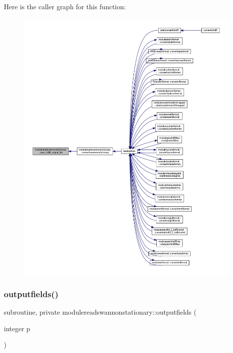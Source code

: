 Here is the caller graph for this function\+:\nopagebreak
\begin{figure}[H]
\begin{center}
\leavevmode
\includegraphics[width=350pt]{namespacemodulereadswannonstationary_adfb4e0c4deb8bcba31fe72f185128ace_icgraph}
\end{center}
\end{figure}
\mbox{\label{namespacemodulereadswannonstationary_a0dbbbf2bfd33dfe83b35c14911f575dc}} 
\subsubsection{\texorpdfstring{outputfields()}{outputfields()}}
{\footnotesize\ttfamily subroutine, private modulereadswannonstationary\+::outputfields (\begin{DoxyParamCaption}\item[{integer}]{p }\end{DoxyParamCaption})\hspace{0.3cm}{\ttfamily [private]}}

